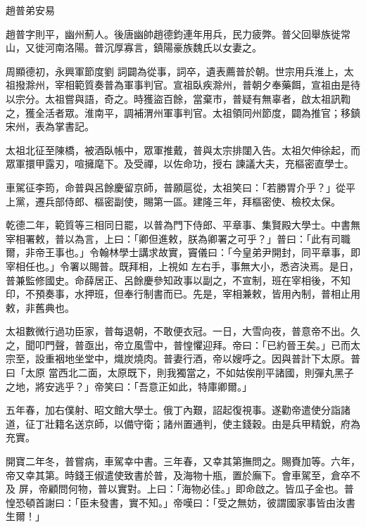 
\begin{pinyinscope}

 趙普弟安易



 趙普字則平，幽州薊人。後唐幽帥趙德鈞連年用兵，民力疲弊。普父回舉族徙常山，又徙河南洛陽。普沉厚寡言，鎮陽豪族魏氏以女妻之。



 周顯德初，永興軍節度劉
 詞闢為從事，詞卒，遺表薦普於朝。世宗用兵淮上，太祖撥滁州，宰相範質奏普為軍事判官。宣祖臥疾滁州，普朝夕奉藥餌，宣祖由是待以宗分。太祖嘗與語，奇之。時獲盜百餘，當棄市，普疑有無辜者，啟太祖訊鞫之，獲全活者眾。淮南平，調補渭州軍事判官。太祖領同州節度，闢為推官；移鎮宋州，表為掌書記。



 太祖北征至陳橋，被酒臥帳中，眾軍推戴，普與太宗排闥入告。太祖欠伸徐起，而眾軍擐甲露刃，喧擁麾下。及受禪，以佐命功，授右
 諫議大夫，充樞密直學士。



 車駕征李筠，命普與呂餘慶留京師，普願扈從，太祖笑曰：「若勝胃介乎？」從平上黨，遷兵部侍郎、樞密副使，賜第一區。建隆三年，拜樞密使、檢校太保。



 乾德二年，範質等三相同日罷，以普為門下侍郎、平章事、集賢殿大學士。中書無宰相署敕，普以為言，上曰：「卿但進敕，朕為卿署之可乎？」普曰：「此有司職爾，非帝王事也。」令翰林學士講求故實，竇儀曰：「今皇弟尹開封，同平章事，即宰相任也。」令署以賜普。既拜相，上視如
 左右手，事無大小，悉咨決焉。是日，普兼監修國史。命薛居正、呂餘慶參知政事以副之，不宣制，班在宰相後，不知印，不預奏事，水押班，但奉行制書而已。先是，宰相兼敕，皆用內制，普相止用敕，非舊典也。



 太祖數微行過功臣家，普每退朝，不敢便衣冠。一日，大雪向夜，普意帝不出。久之，聞叩門聲，普亟出，帝立風雪中，普惶懼迎拜。帝曰：「已約晉王矣。」已而太宗至，設重裀地坐堂中，熾炭燒肉。普妻行酒，帝以嫂呼之。因與普計下太原。普曰「太原
 當西北二面，太原既下，則我獨當之，不如姑俟削平諸國，則彈丸黑子之地，將安逃乎？」帝笑曰：「吾意正如此，特庫卿爾。」



 五年春，加右僕射、昭文館大學士。俄丁內艱，詔起復視事。遂勸帝遣使分詣諸道，征丁壯籍名送京師，以備守衛；諸州置通判，使主錢穀。由是兵甲精銳，府為充實。



 開寶二年冬，普嘗病，車駕幸中書。三年春，又幸其第撫問之。賜賚加等。六年，帝又幸其第。時錢王俶遣使致書於普，及海物十瓶，置於廡下。會車駕至，倉卒不及
 屏，帝顧問何物，普以實對。上曰：「海物必佳。」即命啟之。皆瓜子金也。普惶恐頓首謝曰：「臣未發書，實不知。」帝嘆曰：「受之無妨，彼謂國家事皆由汝書生爾！」




\end{pinyinscope}
